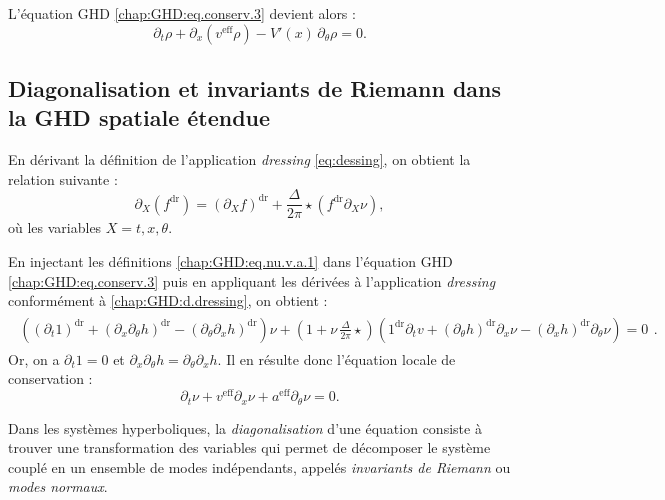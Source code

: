 L’équation GHD \eqref{chap:GHD:eq.conserv.3} devient alors :
\begin{equation}\label{chap:GHD:eq.conserv.3.1}
	\partial_t \rho + \partial_x\!\left(v^{\mathrm{eff}} \rho\right) - V'(x) \, \partial_\theta \rho = 0.
\end{equation}


\subsection{Diagonalisation et invariants de Riemann dans la GHD spatiale étendue}

En dérivant la définition de l'application \emph{dressing} \eqref{eq:dessing}, on obtient la relation suivante :
\begin{equation}\label{chap:GHD:d.dressing}
	\partial_X(f^{\mathrm{dr}}) = \left (\partial_X f \right )^{\mathrm{dr}} + \frac{\Delta}{2\pi} \star ( f^{\mathrm{dr}} \partial_X \nu ), 	
\end{equation}
où les variables \(X = t, x, \theta\).

\medskip

En injectant les définitions \eqref{chap:GHD:eq.nu.v.a.1} dans l'équation GHD \eqref{chap:GHD:eq.conserv.3} puis en appliquant les dérivées à l'application \emph{dressing} conformément à \eqref{chap:GHD:d.dressing}, on obtient :  
\begin{eqnarray}
	\begin{array}{c}\left ( \left(\partial_t 1 \right)^{\mathrm{dr}} + \left(\partial_x  \partial_\theta h  \right)^{\mathrm{dr}} - \left(\partial_\theta  \partial_x h  \right)^{\mathrm{dr}} \right ) \nu + \left ( 1 + \nu \,  \frac{\Delta}{2 \pi } \star  \right ) \left ( 1^{\mathrm{dr}} \partial_t v +  \left ( \partial_\theta h \right )^{\mathrm{dr}} \partial_x \nu -  \left ( \partial_x h \right )^{\mathrm{dr}} \partial_\theta \nu\right ) = 0  \end{array}. 
\end{eqnarray}
Or, on a \(\partial_t 1 = 0\) et \(\partial_x \partial_\theta h = \partial_\theta \partial_x h\). Il en résulte donc l'équation locale de conservation :  
\begin{equation}\label{chap:GHD:eq.nu.1}
	\partial_t \nu + v^{\mathrm{eff}}\partial_x \nu
	+ a^{\mathrm{eff}} \partial_\theta \nu = 0.
\end{equation}  

\medskip

Dans les systèmes hyperboliques, la \emph{diagonalisation} d'une équation consiste à trouver une transformation des variables qui permet de décomposer le système couplé en un ensemble de modes indépendants, appelés \emph{invariants de Riemann} ou \emph{modes normaux}. 

